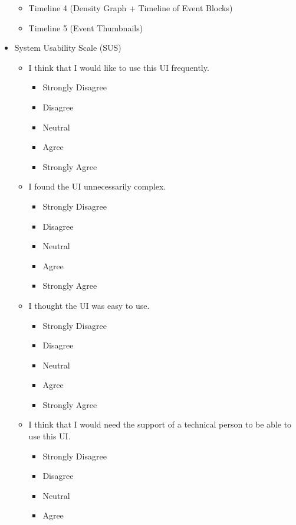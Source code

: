 \documentclass[doublespace,draft,nopageskip]{VTthesis} %
\begin{document}
\begin{itemize}
\begin{itemize}
        \item Timeline 4 (Density Graph + Timeline of Event Blocks)
        \item Timeline 5 (Event Thumbnails)
    \end{itemize}
    \item System Usability Scale (SUS)
    \begin{itemize}
        \item I think that I would like to use this UI frequently.
            \begin{itemize}
                \item Strongly Disagree
                \item Disagree
                \item Neutral
                \item Agree
                \item Strongly Agree
            \end{itemize}
	\item I found the UI unnecessarily complex.
            \begin{itemize}
                \item Strongly Disagree
                \item Disagree
                \item Neutral
                \item Agree
                \item Strongly Agree
            \end{itemize}
	\item I thought the UI was easy to use.
            \begin{itemize}
                \item Strongly Disagree
                \item Disagree
                \item Neutral
                \item Agree
                \item Strongly Agree
            \end{itemize}
        \item I think that I would need the support of a technical person to be able to use this UI.
            \begin{itemize}
                \item Strongly Disagree
                \item Disagree
                \item Neutral
                \item Agree

\end{itemize}
\end{itemize}
\end{itemize}
\end{document}

